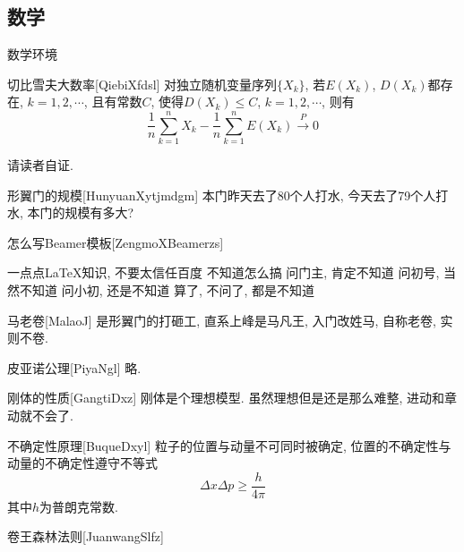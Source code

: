 \documentclass[hyperref, UTF8, CJK]{beamer}
\begin{document}
\subsection{数学}
\begin{frame}{数学环境}
	\begin{scutheorem}{切比雪夫大数率}[QiebiXfdsl]
		对独立随机变量序列$\{X_k\}$, 若$E(X_k)$, $D(X_k)$都存在, $k=1,2,\cdots$, 且有常数$C$, 使得$D(X_k)\leq C$, $k=1,2,\cdots$, 则有
		\begin{equation}
		\dfrac{1}{n} \sum_{k=1}^{n} X_k - \dfrac{1}{n} \sum_{k=1}^{n} E(X_k) \stackrel{\;P\;}{\longrightarrow} 0
		\end{equation}
	\end{scutheorem}
	\begin{scuproof}{}
		请读者自证.
	\end{scuproof}
	\begin{scuexample}{形翼门的规模}[HunyuanXytjmdgm]
		本门昨天去了80个人打水, 今天去了79个人打水, 本门的规模有多大?
	\end{scuexample}
	\begin{scualgorithm}{怎么写Beamer模板}[ZengmoXBeamerzs]
		\begin{algorithmic}[1]
			\REQUIRE 一点点\LaTeX 知识, 不要太信任百度
			\ENSURE 不知道怎么搞
			\STATE 问门主, 肯定不知道
			\STATE 问初号, 当然不知道
			\STATE 问小初, 还是不知道
			\RETURN 算了, 不问了, 都是不知道
		\end{algorithmic}
	\end{scualgorithm}
	\begin{scudefinition}{马老卷}[MalaoJ]
		是形翼门的打砸工, 直系上峰是马凡王, 入门改姓马, 自称老卷, 实则不卷.
	\end{scudefinition}
	\begin{scuaxiom}{皮亚诺公理}[PiyaNgl]
		略.
	\end{scuaxiom}
	\begin{scuproperty}{刚体的性质}[GangtiDxz]
		刚体是个理想模型. 虽然理想但是还是那么难整, 进动和章动就不会了.
	\end{scuproperty}
	\begin{scuproposition}{不确定性原理}[BuqueDxyl]
		粒子的位置与动量不可同时被确定, 位置的不确定性与动量的不确定性遵守不等式
		\begin{equation}
		\Delta x \Delta p \geq \dfrac{h}{4\pi}
		\end{equation}
		其中$h$为普朗克常数.
	\end{scuproposition}
	\begin{sculemma}{卷王森林法则}[JuanwangSlfz]

\end{sculemma}
\end{frame}
\end{document}

